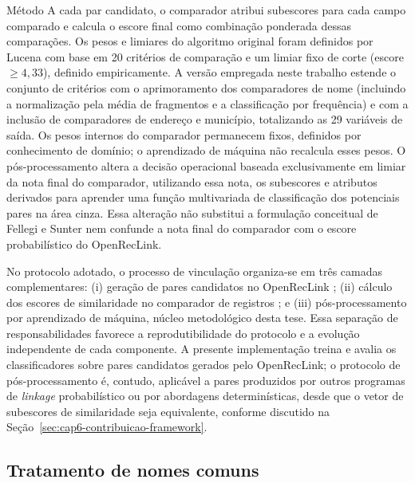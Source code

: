 \begin{chapter}{Método}
A cada par candidato, o comparador atribui subescores para cada campo comparado e calcula o escore final como combinação ponderada dessas comparações. Os pesos e limiares do algoritmo original foram definidos por Lucena \citeyearpar{Lucena2013algoritmos} com base em 20 critérios de comparação e um limiar fixo de corte (escore $\geq 4{,}33$), definido empiricamente. A versão empregada neste trabalho estende o conjunto de critérios com o aprimoramento dos comparadores de nome (incluindo a normalização pela média de fragmentos e a classificação por frequência) e com a inclusão de comparadores de endereço e município, totalizando as 29 variáveis de saída. Os pesos internos do comparador permanecem fixos, definidos por conhecimento de domínio; o aprendizado de máquina não recalcula esses pesos. O pós-processamento altera a decisão operacional baseada exclusivamente em limiar da nota final do comparador, utilizando essa nota, os subescores e atributos derivados para aprender uma função multivariada de classificação dos potenciais pares na área cinza. Essa alteração não substitui a formulação conceitual de Fellegi e Sunter nem confunde a nota final do comparador com o escore probabilístico do OpenRecLink.

No protocolo adotado, o processo de vinculação organiza-se em três camadas complementares: (i) geração de pares candidatos no OpenRecLink \cite{Camargo2000reclink}; (ii) cálculo dos escores de similaridade no comparador de registros \cite{Jardim2024comparador, Lucena2013algoritmos}; e (iii) pós-processamento por aprendizado de máquina, núcleo metodológico desta tese. Essa separação de responsabilidades favorece a reprodutibilidade do protocolo e a evolução independente de cada componente. A presente implementação treina e avalia os classificadores sobre pares candidatos gerados pelo OpenRecLink; o protocolo de pós-processamento é, contudo, aplicável a pares produzidos por outros programas de \textit{linkage} probabilístico ou por abordagens determinísticas, desde que o vetor de subescores de similaridade seja equivalente, conforme discutido na Seção~\ref{sec:cap6-contribuicao-framework}.

\subsection{Tratamento de nomes comuns}\label{sub:nomes-comuns}


\end{chapter}
